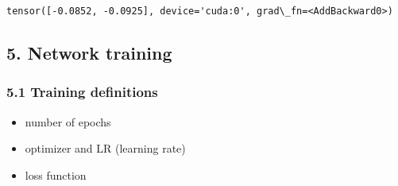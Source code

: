 \documentclass[10pt]{article}
\makeatletter
\providecommand{\tightlist}{%
      \setlength{\itemsep}{0pt}\setlength{\parskip}{0pt}}
\newcommand{\boxspacing}{\kern\kvtcb@left@rule\kern\kvtcb@boxsep}
\newcommand{\prompt}[4]{
        \ttfamily\llap{{\color{#2}[#3]:\hspace{3pt}#4}}\vspace{-\baselineskip}
    }
\makeatother
\begin{document}
            \begin{tcolorbox}[breakable, size=fbox, boxrule=.5pt, pad at break*=1mm, opacityfill=0]
\prompt{Out}{outcolor}{46}{\boxspacing}
\begin{Verbatim}[commandchars=\\\{\}]
tensor([-0.0852, -0.0925], device='cuda:0', grad\_fn=<AddBackward0>)
\end{Verbatim}
\end{tcolorbox}
        
    \hypertarget{network-training}{%
\subsection{5. Network training}\label{network-training}}

    \hypertarget{training-definitions}{%
\subsubsection{5.1 Training definitions}\label{training-definitions}}

\begin{itemize}
\tightlist
\item
  number of epochs
\item
  optimizer and LR (learning rate)
\item
  loss function
\end{itemize}
\end{document}
